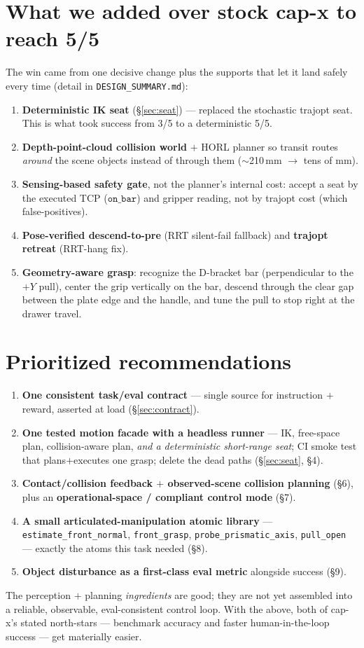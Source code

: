 \documentclass[11pt]{article}
\newcommand{\code}[1]{\texttt{#1}}
\begin{document}
\section{What we added over stock cap-x to reach 5/5}
The win came from one decisive change plus the supports that let it land safely every time
(detail in \code{DESIGN\_SUMMARY.md}):
\begin{enumerate}
  \item \textbf{Deterministic IK seat} (\S\ref{sec:seat}) --- replaced the stochastic trajopt
        seat. This is what took success from 3/5 to a deterministic 5/5.
  \item \textbf{Depth-point-cloud collision world} $+$ HORL planner so transit routes
        \emph{around} the scene objects instead of through them ($\sim$210\,mm $\to$ tens of
        mm).
  \item \textbf{Sensing-based safety gate}, not the planner's internal cost: accept a seat by
        the executed TCP ($\code{on\_bar}$) and gripper reading, not by trajopt cost
        (which false-positives).
  \item \textbf{Pose-verified descend-to-pre} (RRT silent-fail fallback) and \textbf{trajopt
        retreat} (RRT-hang fix).
  \item \textbf{Geometry-aware grasp}: recognize the D-bracket bar (perpendicular to the
        $+Y$ pull), center the grip vertically on the bar, descend through the clear gap
        between the plate edge and the handle, and tune the pull to stop right at the drawer
        travel.
\end{enumerate}

\section{Prioritized recommendations}
\begin{enumerate}
  \item \textbf{One consistent task/eval contract} --- single source for instruction $+$
        reward, asserted at load (\S\ref{sec:contract}).
  \item \textbf{One tested motion facade with a headless runner} --- IK, free-space plan,
        collision-aware plan, \emph{and a deterministic short-range seat}; CI smoke test that
        plans$+$executes one grasp; delete the dead paths (\S\ref{sec:seat}, \S4).
  \item \textbf{Contact/collision feedback $+$ observed-scene collision planning} (\S6),
        plus an \textbf{operational-space / compliant control mode} (\S7).
  \item \textbf{A small articulated-manipulation atomic library} ---
        \code{estimate\_front\_normal}, \code{front\_grasp}, \code{probe\_prismatic\_axis},
        \code{pull\_open} --- exactly the atoms this task needed (\S8).
  \item \textbf{Object disturbance as a first-class eval metric} alongside success (\S9).
\end{enumerate}
The perception $+$ planning \emph{ingredients} are good; they are not yet assembled into a
reliable, observable, eval-consistent control loop. With the above, both of cap-x's stated
north-stars --- benchmark accuracy and faster human-in-the-loop success --- get materially
easier.
\end{document}

